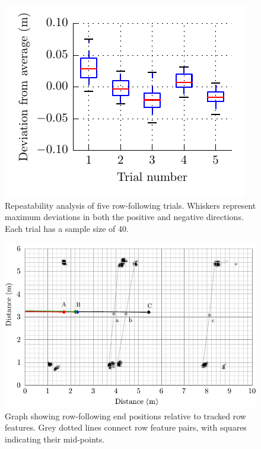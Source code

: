 \documentclass[preprint,authoryear,12pt]{elsarticle}
\begin{document}
    \begin{figure}[htb]
        \centering
        \includegraphics{imgs/slam/row_tracking_repeatability.pdf}
        \caption{
        Repeatability analysis of five row-following trials.
        Whiskers represent maximum deviations in both the positive and negative directions.
        Each trial has a sample size of 40.
        }
        \label{fig:row_following_repeatability}
    \end{figure}


    \begin{figure}[htb]
        \centering
        \includegraphics{imgs/slam/paths_end_points.pdf}
        \caption{
            Graph showing row-following end positions relative to tracked row features.
            Grey dotted lines connect row feature pairs, with squares indicating their mid-points.
        }
        \label{fig:row_following_end_points}
    \end{figure}
\end{document}
